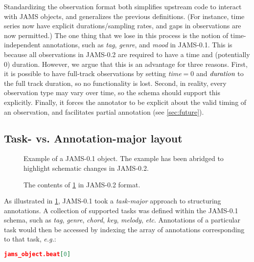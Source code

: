\documentclass{article}
\begin{document}
Standardizing the observation format both simplifies upstream code to interact with JAMS objects, and generalizes the previous
definitions. (For instance, time series now have explicit durations/sampling rates, and gaps in observations are now permitted.)
The one thing that we lose in this process is the notion of time-independent annotations, such as \emph{tag}, \emph{genre}, and \emph{mood} 
in JAMS-0.1.
This is because all observations in JAMS-0.2 are required to have a time and (potentially 0) duration.
However, we argue that this is an advantage for three reasons.
First, it is possible to have full-track observations by setting \emph{time}$=0$ and $\emph{duration}$ to the full track duration, so no functionality is lost.
Second, in reality, every observation type may vary over time, so the schema should support this explicitly.
Finally, it forces the annotator to be explicit about the valid timing of an observation, and facilitates partial annotation (see \cref{sec:future}).

\subsection{Task- vs. Annotation-major layout}\label{sec:schema:task}

\begin{figure}
    \tiny
    
    \caption{Example of a JAMS-0.1 object.  The example has been abridged to highlight
        schematic changes in JAMS-0.2.\label{jams1}}
\end{figure}

\begin{figure}
    \tiny
    
    \caption{The contents of \cref{jams1} in JAMS-0.2 format.\label{jams2}}
\end{figure}

As illustrated in \cref{jams1}, JAMS-0.1 took a \emph{task-major} approach to structuring annotations.  A collection of supported tasks was
defined within the JAMS-0.1 schema, such as \emph{tag}, \emph{genre}, \emph{chord}, \emph{key}, \emph{melody}, \emph{etc}.  Annotations of a
particular task would then be accessed by indexing the array of annotations corresponding to that task, \emph{e.g.}:\\
\begin{lstlisting}[language=json]
  jams_object.beat[0]
\end{lstlisting}
\end{document}
